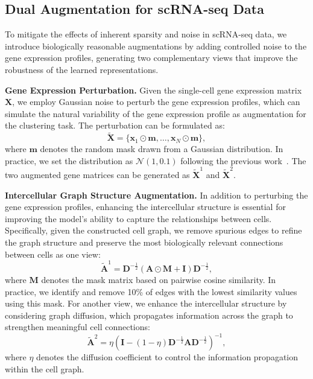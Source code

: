 
\subsection{Dual Augmentation for scRNA-seq Data} 
To mitigate the effects of inherent sparsity and noise in scRNA-seq data, we introduce biologically reasonable augmentations by adding controlled noise to the gene expression profiles, generating two complementary views that improve the robustness of the learned representations. 

\smallskip\noindent\textbf{Gene Expression Perturbation.} Given the single-cell gene expression matrix $\bm{X}$, we employ Gaussian noise to perturb the gene expression profiles, which can simulate the natural variability of the gene expression profile as augmentation for the clustering task. The perturbation can be formulated as:
\begin{equation}
    \tilde{\bm{X}} = \{\bm{x}_1\odot\bm{m},\dots,\bm{x}_{N}\odot\bm{m}\},
\end{equation}
where $\bm{m}$ denotes the random mask drawn from a Gaussian distribution. In practice, we set the distribution as $\mathcal{N}(1,0.1)$ following the previous work~\cite{xu2025scsiameseclu}. The two augmented gene matrices can be generated as $\tilde{\bm{X}}^1$ and $\tilde{\bm{X}}^2$.

\smallskip\noindent\textbf{Intercellular Graph Structure Augmentation.} In addition to perturbing the gene expression profiles, enhancing the intercellular structure is essential for improving the model's ability to capture the relationships between cells. Specifically, given the constructed cell graph, we remove spurious edges to refine the graph structure and preserve the most biologically relevant connections between cells as one view:
\begin{equation}
    \tilde{\bm{A}}^1=\bm{D}^{-\frac{1}{2}}(\bm{A}\odot\bm{M}+\bm{I})\bm{D}^{-\frac{1}{2}},
\end{equation}
where $\bm{M}$ denotes the mask matrix based on pairwise cosine similarity. In practice, we identify and remove 10\% of edges with the lowest similarity values using this mask. For another view, we enhance the intercellular structure by considering graph diffusion, which propagates information across the graph to strengthen meaningful cell connections:
\begin{equation}
    \tilde{\bm{A}}^2=\eta(\bm{I}-(1-\eta)\bm{D}^{-\frac{1}{2}}\bm{A}\bm{D}^{-\frac{1}{2}})^{-1},
\end{equation}
where $\eta$ denotes the diffusion coefficient to control the information propagation within the cell graph.


